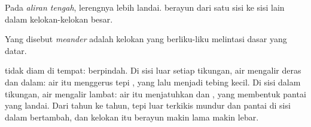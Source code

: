 Pada \emph{aliran tengah}, lerengnya lebih landai.  berayun dari satu
sisi ke sisi lain dalam kelokan-kelokan besar.

\begin{definition}[Meander]\label{def:g5:water-shapes-the-land:meander}
Yang disebut \emph{meander} adalah kelokan  yang
berliku-liku melintasi dasar  yang datar.
\end{definition}

 tidak diam di tempat:  berpindah. Di sisi luar setiap
tikungan, air mengalir deras dan dalam: air itu menggerus tepi ,
yang lalu menjadi tebing kecil. Di sisi dalam tikungan, air mengalir
lambat: air itu menjatuhkan  dan , yang membentuk pantai yang
landai. Dari tahun ke tahun, tepi luar terkikis mundur dan pantai di sisi
dalam bertambah, dan kelokan itu berayun makin lama makin lebar.

